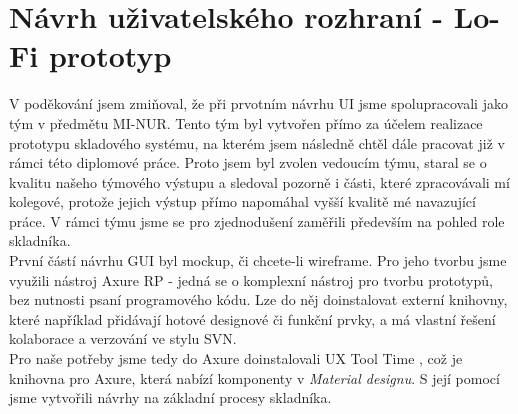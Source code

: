 \section{Návrh uživatelského rozhraní - Lo-Fi prototyp}

V poděkování jsem zmiňoval, že při prvotním návrhu UI jsme spolupracovali jako tým v předmětu MI-NUR. Tento tým byl vytvořen přímo za účelem realizace prototypu skladového systému, na kterém jsem následně chtěl dále pracovat již v rámci této diplomové práce. Proto jsem byl zvolen vedoucím týmu, staral se o kvalitu našeho týmového výstupu a sledoval pozorně i části, které zpracovávali mí kolegové, protože jejich výstup přímo napomáhal vyšší kvalitě mé navazující práce. V rámci týmu jsme se pro zjednodušení zaměřili především na pohled role skladníka.\\
První částí návrhu GUI byl mockup, či chcete-li wireframe. Pro jeho tvorbu jsme využili nástroj Axure RP \cite{axure} - jedná se o komplexní nástroj pro tvorbu prototypů, bez nutnosti psaní programového kódu. Lze do něj doinstalovat externí knihovny, které například přidávají hotové designové či funkční prvky, a má vlastní řešení kolaborace a verzování ve stylu SVN.\\
Pro naše potřeby jsme tedy do Axure doinstalovali UX Tool Time \cite{uxtooltime}, což je knihovna pro Axure, která nabízí komponenty v \emph{Material designu}. S její pomocí jsme vytvořili návrhy na základní procesy skladníka.\\

